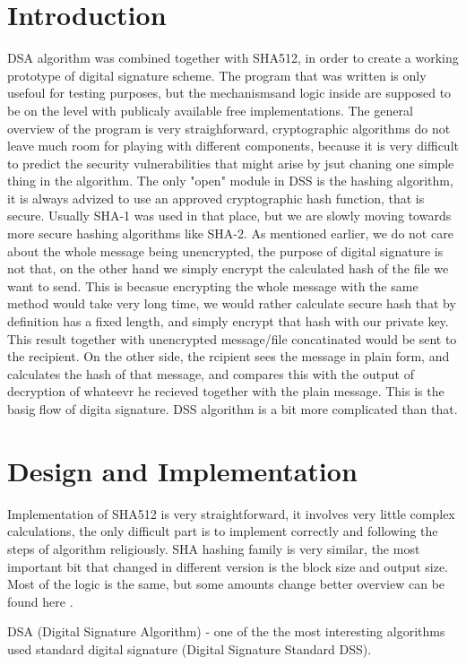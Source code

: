 \documentclass[12pt]{report}
\begin{document}
\section*{Introduction}
DSA algorithm was combined together with SHA512, in order to create a working prototype of digital signature scheme. The program that was written is only usefoul for testing purposes, but the mechanismsand logic inside are supposed to be on the level with publicaly available free implementations. The general overview of the program is very straighforward, cryptographic algorithms do not leave much room for playing with different components, because it is very difficult to predict the security vulnerabilities that might arise by jsut chaning one simple thing in the algorithm. The only "open" module in DSS is the hashing algorithm, it is always advized to use an approved cryptographic hash function, that is secure. Usually SHA-1 was used in that place, but we are slowly moving towards more secure hashing algorithms like SHA-2. As mentioned earlier, we do not care about the whole message being unencrypted, the purpose of digital signature is not that, on the other hand we simply encrypt the calculated hash of the file we want to send. This is becasue encrypting the whole message with the same method would take very long time, we would rather calculate secure hash that by definition has a fixed length, and simply encrypt that hash with our private key. This result together with unencrypted message/file concatinated would be sent to the recipient. On the other side, the rcipient sees the message in plain form, and calculates the hash of that message, and compares this with the output of decryption of whateevr he recieved together with the plain message. This is the basig flow of digita signature. DSS algorithm is a bit more complicated than that. 

\section*{Design and Implementation}
Implementation of SHA512 is very straightforward, it involves very little complex calculations, the only difficult part is to implement correctly and following the steps of algorithm religiously. SHA hashing family is very similar, the most important bit that changed in different version is the block size and output size. Most of the logic is the same, but some amounts change better overview can be found here \cite{sha512}.

DSA (Digital Signature Algorithm) - one of the the most interesting algorithms used standard digital signature (Digital Signature Standard DSS).
\end{document}
